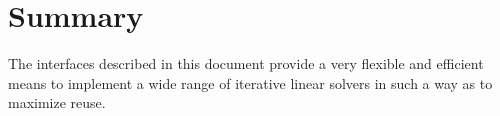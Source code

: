\documentclass[pdf,ps2pdf,11pt]{SANDreport}
\begin{document}
\section{Summary}

The interfaces described in this document provide a very flexible and
efficient means to implement a wide range of iterative linear solvers
in such a way as to maximize reuse.

%
\clearpage



%
%
\end{document}

